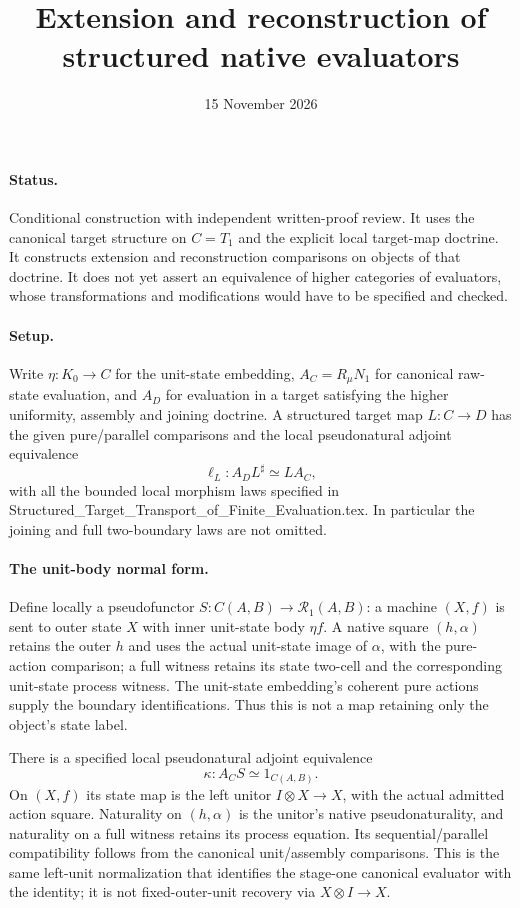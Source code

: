 \documentclass{article}
\title{Extension and reconstruction of structured native evaluators}
\date{15 November 2026}
\begin{document}
\maketitle
\paragraph{Status.} Conditional construction with independent written-proof review. It uses the canonical target structure on $C=T_1$ and the explicit local target-map doctrine. It constructs extension and reconstruction comparisons on objects of that doctrine. It does not yet assert an equivalence of higher categories of evaluators, whose transformations and modifications would have to be specified and checked.

\paragraph{Setup.} Write $\eta:K_0\to C$ for the unit-state embedding, $A_C=R_\mu N_1$ for canonical raw-state evaluation, and $A_D$ for evaluation in a target satisfying the higher uniformity, assembly and joining doctrine. A structured target map $L:C\to D$ has the given pure/parallel comparisons and the local pseudonatural adjoint equivalence
\[
 \ell_L:A_D L^\sharp\simeq L A_C,
\]
with all the bounded local morphism laws specified in Structured\_Target\_Transport\_of\_Finite\_Evaluation.tex. In particular the joining and full two-boundary laws are not omitted.

\paragraph{The unit-body normal form.} Define locally a pseudofunctor $S:C(A,B)\to\mathcal R_1(A,B)$: a machine $(X,f)$ is sent to outer state $X$ with inner unit-state body $\eta f$. A native square $(h,\alpha)$ retains the outer $h$ and uses the actual unit-state image of $\alpha$, with the pure-action comparison; a full witness retains its state two-cell and the corresponding unit-state process witness. The unit-state embedding's coherent pure actions supply the boundary identifications. Thus this is not a map retaining only the object's state label.

There is a specified local pseudonatural adjoint equivalence
\[
 \kappa:A_C S\simeq 1_{C(A,B)}.
\]
On $(X,f)$ its state map is the left unitor $I\otimes X\to X$, with the actual admitted action square. Naturality on $(h,\alpha)$ is the unitor's native pseudonaturality, and naturality on a full witness retains its process equation. Its sequential/parallel compatibility follows from the canonical unit/assembly comparisons. This is the same left-unit normalization that identifies the stage-one canonical evaluator with the identity; it is not fixed-outer-unit recovery via $X\otimes I\to X$.
\end{document}
